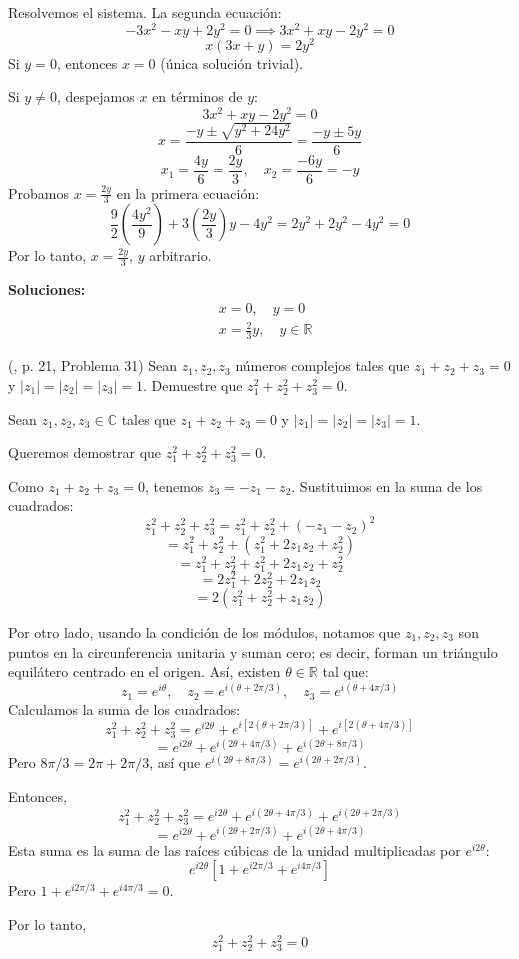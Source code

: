 \begin{prob}
\begin{myproof}
Resolvemos el sistema. La segunda ecuación:
\[
-3x^2 - xy + 2y^2 = 0 \implies 3x^2 + xy - 2y^2 = 0
\]
\[
x(3x + y) = 2y^2
\]
Si $y = 0$, entonces $x = 0$ (única solución trivial).

Si $y \neq 0$, despejamos $x$ en términos de $y$:
\[
3x^2 + xy - 2y^2 = 0
\]
\[
x = \frac{-y \pm \sqrt{y^2 + 24y^2}}{6} = \frac{-y \pm 5y}{6}
\]
\[
x_1 = \frac{4y}{6} = \frac{2y}{3}, \quad x_2 = \frac{-6y}{6} = -y
\]
Probamos $x = \frac{2y}{3}$ en la primera ecuación:
\[
\frac{9}{2}\left(\frac{4y^2}{9}\right) + 3\left(\frac{2y}{3}\right)y - 4y^2 = 2y^2 + 2y^2 - 4y^2 = 0
\]
Por lo tanto, $x = \frac{2y}{3}$, $y$ arbitrario.

\textbf{Soluciones:}
\[
\boxed{
\begin{aligned}
&x = 0,\quad y = 0 \\
&x = \frac{2}{3}y,\quad y\in\mathbb{R}
\end{aligned}
}
\]
\end{myproof}
\end{prob}

\begin{prob} (\cite{andreescu2014complex}, p. 21, Problema 31) Sean $z_1, z_2, z_3$ números complejos tales que $z_1+z_2+z_3=0$ y $|z_1|=|z_2|=|z_3|=1$. Demuestre que $z_1^2+z_2^2+z_3^2=0$.
\begin{myproof}
Sean $z_1, z_2, z_3 \in \mathbb{C}$ tales que $z_1 + z_2 + z_3 = 0$ y $|z_1| = |z_2| = |z_3| = 1$.

Queremos demostrar que $z_1^2 + z_2^2 + z_3^2 = 0$.

Como $z_1 + z_2 + z_3 = 0$, tenemos $z_3 = -z_1 - z_2$. Sustituimos en la suma de los cuadrados:
\[
z_1^2 + z_2^2 + z_3^2 = z_1^2 + z_2^2 + (-z_1 - z_2)^2
\]
\[
= z_1^2 + z_2^2 + (z_1^2 + 2z_1z_2 + z_2^2)
\]
\[
= z_1^2 + z_2^2 + z_1^2 + 2z_1z_2 + z_2^2
\]
\[
= 2z_1^2 + 2z_2^2 + 2z_1z_2
\]
\[
= 2(z_1^2 + z_2^2 + z_1z_2)
\]

Por otro lado, usando la condición de los módulos, notamos que $z_1, z_2, z_3$ son puntos en la circunferencia unitaria y suman cero; es decir, forman un triángulo equilátero centrado en el origen. Así, existen $\theta \in \mathbb{R}$ tal que:
\[
z_1 = e^{i\theta},\quad z_2 = e^{i(\theta + 2\pi/3)},\quad z_3 = e^{i(\theta + 4\pi/3)}
\]
Calculamos la suma de los cuadrados:
\[
z_1^2 + z_2^2 + z_3^2 = e^{i2\theta} + e^{i[2(\theta + 2\pi/3)]} + e^{i[2(\theta + 4\pi/3)]}
\]
\[
= e^{i2\theta} + e^{i(2\theta + 4\pi/3)} + e^{i(2\theta + 8\pi/3)}
\]
Pero $8\pi/3 = 2\pi + 2\pi/3$, así que $e^{i(2\theta + 8\pi/3)} = e^{i(2\theta + 2\pi/3)}$.

Entonces,
\[
z_1^2 + z_2^2 + z_3^2 = e^{i2\theta} + e^{i(2\theta + 4\pi/3)} + e^{i(2\theta + 2\pi/3)}
\]
\[
= e^{i2\theta} + e^{i(2\theta + 2\pi/3)} + e^{i(2\theta + 4\pi/3)}
\]
Esta suma es la suma de las raíces cúbicas de la unidad multiplicadas por $e^{i2\theta}$:
\[
e^{i2\theta} \left[1 + e^{i2\pi/3} + e^{i4\pi/3}\right]
\]
Pero $1 + e^{i2\pi/3} + e^{i4\pi/3} = 0$.

Por lo tanto,
\[
z_1^2 + z_2^2 + z_3^2 = 0
\]
\end{myproof}
\end{prob}

